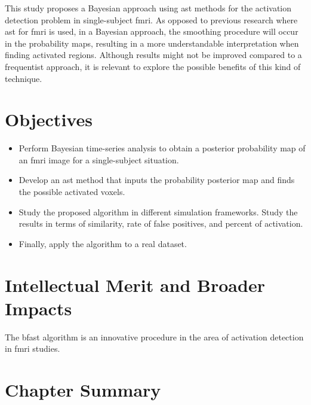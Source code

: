 This study proposes a Bayesian approach using \gls{ast} methods for the 
activation detection problem in single-subject \gls{fmri}. As opposed to 
previous research where \gls{ast} for \gls{fmri} is used, in a Bayesian 
approach, the smoothing procedure will occur in the probability maps, 
resulting in a more understandable interpretation when finding activated 
regions. Although results might not be improved compared to a frequentist 
approach, it is relevant to explore the possible benefits of this kind of 
technique. 

\section{Objectives}

\begin{itemize}
\item Perform Bayesian time-series analysis to obtain a posterior probability 
map of an \gls{fmri} image for a single-subject situation.
\item Develop an \gls{ast} method that inputs the probability posterior map 
and finds the possible activated voxels.
\item Study the proposed algorithm in different simulation frameworks. Study 
the results in terms of similarity, rate of false positives, and percent of 
activation.
\item Finally, apply the algorithm to a real dataset.
\end{itemize}

\section{Intellectual Merit and Broader Impacts}

The \gls{bfast} algorithm is an innovative procedure in the area of 
activation detection in \gls{fmri} studies. %


\section{Chapter Summary}

